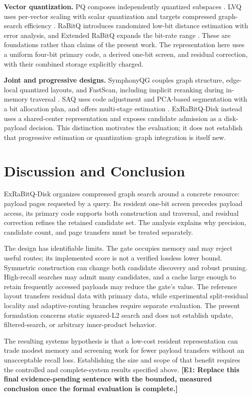 \textbf{Vector quantization.} PQ composes independently quantized subspaces \cite{pq}. LVQ uses per-vector scaling with scalar quantization and targets compressed graph-search efficiency \cite{lvq}. RaBitQ introduces randomized low-bit distance estimation with error analysis, and Extended RaBitQ expands the bit-rate range \cite{rabitq,exrabitq}. These are foundations rather than claims of the present work. The representation here uses a uniform four-bit primary code, a derived one-bit screen, and residual correction, with their combined storage explicitly charged.

\textbf{Joint and progressive designs.} SymphonyQG couples graph structure, edge-local quantized layouts, and FastScan, including implicit reranking during in-memory traversal \cite{symphonyqg}. SAQ uses code adjustment and PCA-based segmentation with a bit allocation plan, and offers multi-stage estimation \cite{saq}. ExRaBitQ-Disk instead uses a shared-center representation and exposes candidate admission as a disk-payload decision. This distinction motivates the evaluation; it does not establish that progressive estimation or quantization--graph integration is itself new.

\section{Discussion and Conclusion}

ExRaBitQ-Disk organizes compressed graph search around a concrete resource: payload pages requested by a query. Its resident one-bit screen precedes payload access, its primary code supports both construction and traversal, and residual correction refines the retained candidate set. The analysis explains why precision, candidate count, and page transfers must be treated separately.

The design has identifiable limits. The gate occupies memory and may reject useful routes; its implemented score is not a verified lossless lower bound. Symmetric construction can change both candidate discovery and robust pruning. High-recall searches may admit many candidates, and a cache large enough to retain frequently accessed payloads may reduce the gate's value. The reference layout transfers residual data with primary data, while experimental split-residual locality and adaptive-routing branches require separate evaluation. The present formulation concerns static squared-L2 search and does not establish update, filtered-search, or arbitrary inner-product behavior.

The resulting systems hypothesis is that a low-cost resident representation can trade modest memory and screening work for fewer payload transfers without an unacceptable recall loss. Establishing the size and scope of that benefit requires the controlled and complete-system results specified above. \textbf{[E1: Replace this final evidence-pending sentence with the bounded, measured conclusion once the formal evaluation is complete.]}


